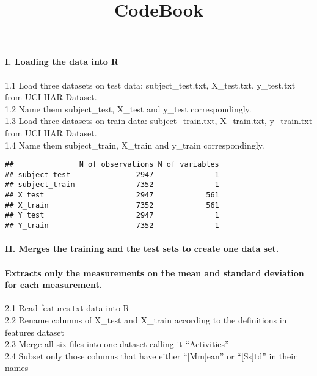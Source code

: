 \documentclass[
]{article}
\title{CodeBook}
\date{}
\begin{document}
\maketitle

\hypertarget{i.-loading-the-data-into-r}{%
\paragraph{I. Loading the data into
R}\label{i.-loading-the-data-into-r}}

1.1 Load three datasets on test data: subject\_test.txt, X\_test.txt,
y\_test.txt from UCI HAR Dataset.\\
1.2 Name them subject\_test, X\_test and y\_test correspondingly.\\
1.3 Load three datasets on train data: subject\_train.txt, X\_train.txt,
y\_train.txt from UCI HAR Dataset.\\
1.4 Name them subject\_train, X\_train and y\_train correspondingly.

\begin{verbatim}
##               N of observations N of variables
## subject_test               2947              1
## subject_train              7352              1
## X_test                     2947            561
## X_train                    7352            561
## Y_test                     2947              1
## Y_train                    7352              1
\end{verbatim}

\hypertarget{ii.-merges-the-training-and-the-test-sets-to-create-one-data-set.}{%
\paragraph{II. Merges the training and the test sets to create one data
set.}\label{ii.-merges-the-training-and-the-test-sets-to-create-one-data-set.}}

\hypertarget{extracts-only-the-measurements-on-the-mean-and-standard-deviation-for-each-measurement.}{%
\paragraph{Extracts only the measurements on the mean and standard
deviation for each
measurement.}\label{extracts-only-the-measurements-on-the-mean-and-standard-deviation-for-each-measurement.}}

2.1 Read features.txt data into R\\
2.2 Rename columns of X\_test and X\_train according to the definitions
in features dataset\\
2.3 Merge all six files into one dataset calling it ``Activities''\\
2.4 Subset only those columns that have either ``{[}Mm{]}ean'' or
``{[}Ss{]}td'' in their names
\end{document}
